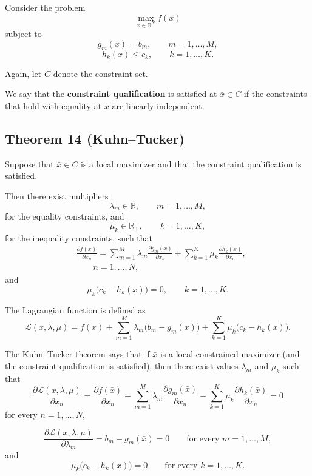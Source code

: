 Consider the problem
\[
\max_{x \in \mathbb{R}^N} f(x)
\]
subject to
\[
g_m(x)=b_m, \qquad m=1,\dots,M,
\]
\[
h_k(x)\le c_k, \qquad k=1,\dots,K.
\]

Again, let $C$ denote the constraint set.

We say that the \textbf{constraint qualification} is satisfied at $\bar x \in C$
if the constraints that hold with equality at $\bar x$ are linearly independent.


\begin{tcolorbox}[breakable, colback=white]

\subsection*{Theorem 14 (Kuhn--Tucker)}

Suppose that $\bar x \in C$ is a local maximizer and that the constraint qualification is satisfied.

Then there exist multipliers
\[
\lambda_m \in \mathbb{R}, \qquad m=1,\dots,M,
\]
for the equality constraints, and
\[
\mu_k \in \mathbb{R}_+, \qquad k=1,\dots,K,
\]
for the inequality constraints, such that
\[
\begin{aligned}
&\frac{\partial f(x)}{\partial x_n}
=
\sum_{m=1}^M \lambda_m \frac{\partial g_m(x)}{\partial x_n}
+
\sum_{k=1}^K \mu_k \frac{\partial h_k(x)}{\partial x_n},\\
&\qquad n=1,\dots,N,
\end{aligned}
\]
and
\[
\mu_k\bigl(c_k - h_k(x)\bigr)=0,
\qquad k=1,\dots,K.
\]
\end{tcolorbox}


\medskip



The Lagrangian function is defined as
\[
\mathcal{L}(x,\lambda,\mu)
=
f(x)
+
\sum_{m=1}^M \lambda_m \bigl(b_m-g_m(x)\bigr)
+
\sum_{k=1}^K \mu_k \bigl(c_k-h_k(x)\bigr).
\]

The Kuhn--Tucker theorem says that if $\bar x$ is a local constrained maximizer
(and the constraint qualification is satisfied), then there exist values
$\lambda_m$ and $\mu_k$ such that
\[
\frac{\partial \mathcal{L}(x,\lambda,\mu)}{\partial x_n}
=
\frac{\partial f(\bar x)}{\partial x_n}
-
\sum_{m=1}^M \lambda_m \frac{\partial g_m(\bar x)}{\partial x_n}
-
\sum_{k=1}^K \mu_k \frac{\partial h_k(\bar x)}{\partial x_n}
=0
\]
for every $n=1,\dots,N$,

\[
\frac{\partial \mathcal{L}(x,\lambda,\mu)}{\partial \lambda_m}
=
b_m-g_m(\bar x)=0
\qquad \text{for every } m=1,\dots,M,
\]
and
\[
\mu_k\bigl(c_k-h_k(\bar x)\bigr)=0
\qquad \text{for every } k=1,\dots,K.
\]

